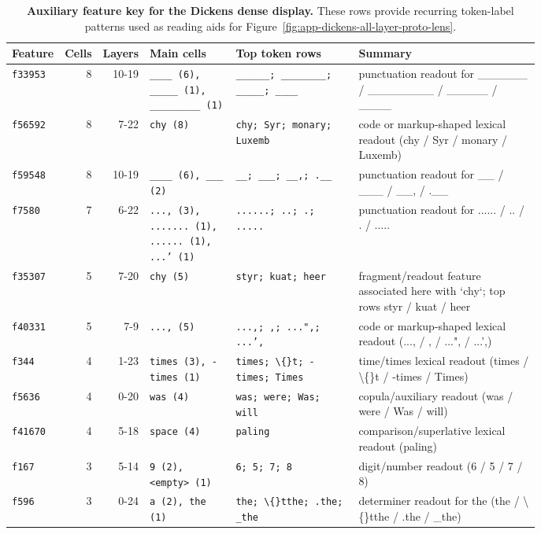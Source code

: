 \begin{table}[p]
\caption{\textbf{Auxiliary feature key for the Dickens dense display.} These rows provide recurring token-label patterns used as reading aids for Figure~\ref{fig:app-dickens-all-layer-proto-lens}.}
\label{tab:app-dickens-feature-key-lowmedium}
\centering
\scriptsize
\setlength{\tabcolsep}{2pt}
\begin{tabular}{@{}lrrp{0.17\linewidth}p{0.25\linewidth}p{0.36\linewidth}@{}}
\toprule
Feature & Cells & Layers & Main cells & Top token rows & Summary \\
\midrule
\texttt{f33953} & 8 & 10-19 & \texttt{\_\_\_\_ (6), \_\_\_\_\_ (1), \_\_\_\_\_\_\_\_\_ (1)} & \texttt{\_\_\_\_\_\_; \_\_\_\_\_\_\_\_; \_\_\_\_\_; \_\_\_\_} & punctuation readout for \_\_\_\_\_\_ / \_\_\_\_\_\_\_\_ / \_\_\_\_\_ / \_\_\_\_ \\
\texttt{f56592} & 8 & 7-22 & \texttt{chy (8)} & \texttt{chy; Syr; monary; Luxemb} & code or markup-shaped lexical readout (chy / Syr / monary / Luxemb) \\
\texttt{f59548} & 8 & 10-19 & \texttt{\_\_\_\_ (6), \_\_\_ (2)} & \texttt{\_\_; \_\_\_; \_\_,; .\_\_} & punctuation readout for \_\_ / \_\_\_ / \_\_, / .\_\_ \\
\texttt{f7580} & 7 & 6-22 & \texttt{..., (3), ....... (1), ...... (1), ...' (1)} & \texttt{......; ..; .; .....} & punctuation readout for ...... / .. / . / ..... \\
\texttt{f35307} & 5 & 7-20 & \texttt{chy (5)} & \texttt{styr; kuat; heer} & fragment/readout feature associated here with `chy`; top rows styr / kuat / heer \\
\texttt{f40331} & 5 & 7-9 & \texttt{..., (5)} & \texttt{...,; ,; ...",; ...',} & code or markup-shaped lexical readout (..., / , / ...", / ...',) \\
\texttt{f344} & 4 & 1-23 & \texttt{times (3), -times (1)} & \texttt{times; \textbackslash\{\}t; -times; Times} & time/times lexical readout (times / \textbackslash\{\}t / -times / Times) \\
\texttt{f5636} & 4 & 0-20 & \texttt{was (4)} & \texttt{was; were; Was; will} & copula/auxiliary readout (was / were / Was / will) \\
\texttt{f41670} & 4 & 5-18 & \texttt{space (4)} & \texttt{paling} & comparison/superlative lexical readout (paling) \\
\texttt{f167} & 3 & 5-14 & \texttt{9 (2), <empty> (1)} & \texttt{6; 5; 7; 8} & digit/number readout (6 / 5 / 7 / 8) \\
\texttt{f596} & 3 & 0-24 & \texttt{a (2), the (1)} & \texttt{the; \textbackslash\{\}tthe; .the; \_the} & determiner readout for the (the / \textbackslash\{\}tthe / .the / \_the) \\

\end{tabular}
\end{table}
